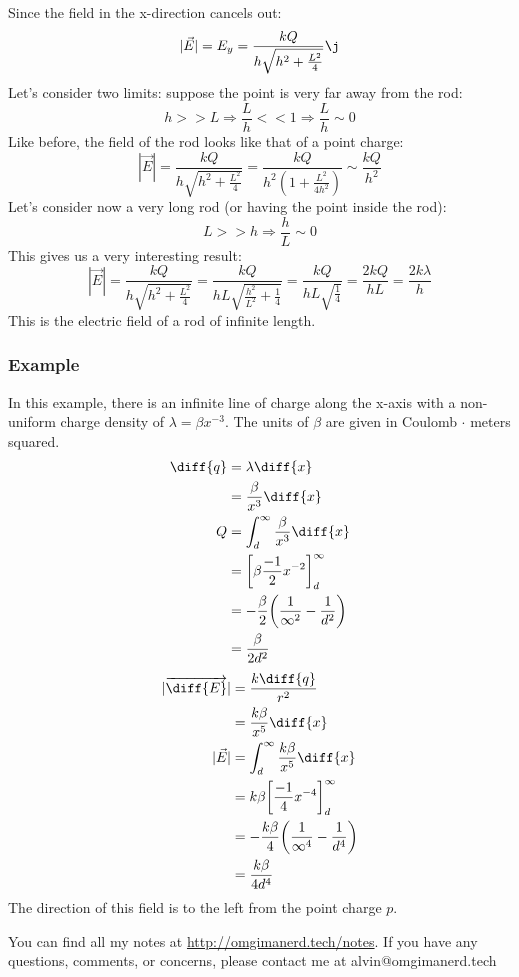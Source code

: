 \documentclass{math}
\begin{document}
Since the field in the x-direction cancels out:
\[ |\vec{E}| = E_y = \frac{kQ}{h\sqrt{h^2+\frac{L^2}{4}}}\j \]
Let's consider two limits: suppose the point is very far away from the rod:
\[ h >> L \Rightarrow \frac{L}{h} << 1 \Rightarrow \frac{L}{h}\sim 0 \]
Like before, the field of the rod looks like that of a point charge:
\[ |\vec{E}| = \frac{kQ}{h\sqrt{h^2+\frac{L^2}{4}}} =
  \frac{kQ}{h^2(1+\frac{L^2}{4h^2})} \sim \frac{kQ}{h^2} \]
Let's consider now a very long rod (or having the point inside the rod):
\[ L >> h \Rightarrow \frac{h}{L} \sim 0 \]
This gives us a very interesting result:
\[ |\vec{E}| = \frac{kQ}{h\sqrt{h^2+\frac{L^2}{4}}} =
  \frac{kQ}{hL\sqrt{\frac{h^2}{L^2}+\frac{1}{4}}} =
  \frac{kQ}{hL\sqrt{\frac{1}{4}}} = \frac{2kQ}{hL} = \frac{2k\lambda}{h} \]
This is the electric field of a rod of infinite length.

\subsubsection*{Example}
\begin{center}
\end{center}
In this example, there is an infinite line of charge along the x-axis with a
non-uniform charge density of \( \lambda = \beta x^{-3} \). The units of
\( \beta \) are given in Coulomb \( \cdot \) meters squared.
\begin{align*}
  \diff{q} &= \lambda\diff{x} \\
  &= \frac{\beta}{x^3}\diff{x} \\
  Q &= \int_{d}^{\infty}\frac{\beta}{x^3}\diff{x} \\
  &= \bigg[\beta\frac{-1}{2}x^{-2}\bigg]_{d}^{\infty} \\
  &= -\frac{\beta}{2}\bigg(\frac{1}{\infty^2}-\frac{1}{d^2}\bigg) \\
  &= \frac{\beta}{2d^2} \\
\end{align*}
\begin{align*}
  |\overrightarrow{\diff{E}}| &= \frac{k\diff{q}}{r^2} \\
  &= \frac{k\beta}{x^5}\diff{x} \\
  |\vec{E}| &= \int_{d}^{\infty}\frac{k\beta}{x^5}\diff{x} \\
  &= k\beta\bigg[\frac{-1}{4}x^{-4}\bigg]_{d}^{\infty} \\
  &= -\frac{k\beta}{4}\bigg(\frac{1}{\infty^4}-\frac{1}{d^4}\bigg) \\
  &= \frac{k\beta}{4d^4}
\end{align*}
The direction of this field is to the left from the point charge \( p \).

\begin{center}
  You can find all my notes at \url{http://omgimanerd.tech/notes}. If you have
  any questions, comments, or concerns, please contact me at
  alvin@omgimanerd.tech
\end{center}
\end{document}

